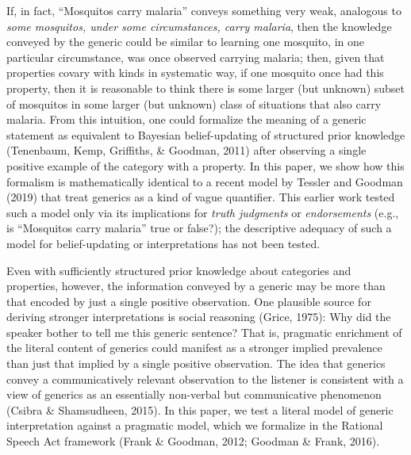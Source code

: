 \documentclass[floatsintext,doc]{apa6}
\begin{document}
If, in fact, \enquote{Mosquitos carry malaria} conveys something very weak, analogous to \emph{some mosquitos, under some circumstances, carry malaria}, then the knowledge conveyed by the generic could be similar to learning one mosquito, in one particular circumstance, was once observed carrying malaria; then, given that properties covary with kinds in systematic way, if one mosquito once had this property, then it is reasonable to think there is some larger (but unknown) subset of mosquitos in some larger (but unknown) class of situations that also carry malaria.
From this intuition, one could formalize the meaning of a generic statement as equivalent to Bayesian belief-updating of structured prior knowledge (Tenenbaum, Kemp, Griffiths, \& Goodman, 2011) after observing a single positive example of the category with a property.
In this paper, we show how this formalism is mathematically identical to a recent model by Tessler and Goodman (2019) that treat generics as a kind of vague quantifier.
This earlier work tested such a model only via its implications for \emph{truth judgments} or \emph{endorsements} (e.g., is \enquote{Mosquitos carry malaria} true or false?); the descriptive adequacy of such a model for belief-updating or interpretations has not been tested.

Even with sufficiently structured prior knowledge about categories and properties, however, the information conveyed by a generic may be more than that encoded by just a single positive observation.
One plausible source for deriving stronger interpretations is social reasoning (Grice, 1975): Why did the speaker bother to tell me this generic sentence?
That is, pragmatic enrichment of the literal content of generics could manifest as a stronger implied prevalence than just that implied by a single positive observation.
The idea that generics convey a communicatively relevant observation to the listener is consistent with a view of generics as an essentially non-verbal but communicative phenomenon (Csibra \& Shamsudheen, 2015).
In this paper, we test a literal model of generic interpretation against a pragmatic model, which we formalize in the Rational Speech Act framework (Frank \& Goodman, 2012; Goodman \& Frank, 2016).
\end{document}
